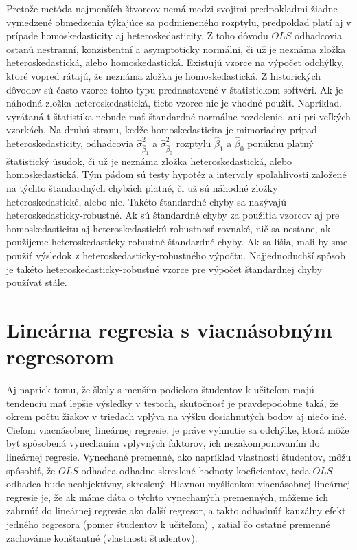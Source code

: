 \documentclass[]{tukediphc}
\begin{document}
Pretože metóda najmenších štvorcov nemá medzi svojimi predpokladmi žiadne vymedzené obmedzenia týkajúce sa podmieneného rozptylu, predpoklad platí aj v prípade homoskedasticity aj heteroskedasticity. Z toho dôvodu $OLS$ odhadcovia ostanú nestranní, konzistentní a asymptoticky normálni, či už je neznáma zložka heteroskedastická, alebo homoskedastická. Existujú vzorce na výpočet odchýlky, ktoré vopred rátajú, že neznáma zložka je homoskedastická. Z historických dôvodov sú často vzorce tohto typu prednastavené v štatistickom softvéri. Ak je náhodná zložka heteroskedastická, tieto vzorce nie je vhodné použiť. Napríklad, vyrátaná t-štatistika nebude mať štandardné normálne rozdelenie, ani pri veľkých vzorkách. Na druhú stranu, keďže homoskedasticita je mimoriadny prípad heteroskedasticity, odhadcovia $\hat\sigma^2_{\hat\beta_{1}}$ a $\hat\sigma^2_{\hat\beta_{0}}$ rozptylu $\hat\beta_{1}$ a $\hat\beta_{0}$ ponúknu platný štatistický úsudok, či už je neznáma zložka heteroskedastická, alebo homoskedastická. Tým pádom sú testy hypotéz a intervaly spoľahlivosti založené na týchto štandardných chybách platné, či už sú náhodné zložky heteroskedastické, alebo nie. Takéto štandardné chyby sa nazývajú heteroskedasticky-robustné. Ak sú štandardné chyby za použitia vzorcov aj pre homoskedasticitu aj heteroskedastickú robustnosť rovnaké, nič sa nestane, ak použijeme heteroskedasticky-robustné štandardné chyby. Ak sa líšia, mali by sme použiť výsledok z heteroskedasticky-robustného výpočtu. Najjednoduchší spôsob je takéto heteroskedasticky-robustné vzorce pre výpočet štandardnej chyby používať stále. 

\section{Lineárna regresia s viacnásobným regresorom}

Aj napriek tomu, že školy s menším podielom študentov k učiteľom majú tendenciu mať lepšie výsledky v testoch, skutočnosť je pravdepodobne taká, že okrem počtu žiakov v triedach vplýva na výšku dosiahnutých bodov aj niečo iné. Cieľom viacnásobnej lineárnej regresie, je práve vyhnutie sa odchýlke, ktorá môže byť spôsobená vynechaním vplyvných faktorov, ich  nezakomponovaním do lineárnej regresie. Vynechané premenné, ako napríklad vlastnosti študentov, môžu spôsobiť, že $OLS$ odhadca odhadne skreslené hodnoty koeficientov, teda $OLS$ odhadca bude neobjektívny, skreslený. Hlavnou myšlienkou viacnásobnej lineárnej regresie je, že ak máme dáta o týchto vynechaných premenných, môžeme ich zahrnúť do lineárnej regresie ako ďalší regresor, a takto odhadnúť kauzálny efekt jedného regresora (pomer študentov k učiteľom) , zatiaľ čo ostatné premenné zachováme konštantné (vlastnosti študentov). 
\end{document}
